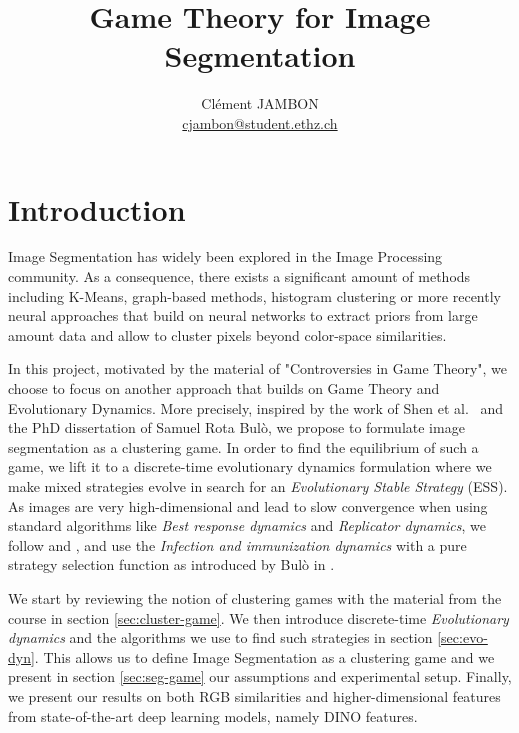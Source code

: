 \documentclass[11pt,a4paper]{article}
\begin{document}
\title{Game Theory for Image Segmentation}
\author{Clément JAMBON \\ \href{mailto:cjambon@student.ethz.ch}{cjambon@student.ethz.ch}}
\maketitle

    

\section{Introduction}

Image Segmentation has widely been explored in the Image Processing community. As a consequence, there exists a significant amount of methods including K-Means, graph-based methods\cite{graph-segmentation}, histogram clustering\cite{histogram-clustering} or more recently neural approaches that build on neural networks to extract priors from large amount data\cite{panoptic-segmentation} and allow to cluster pixels beyond color-space similarities.

In this project, motivated by the material of "Controversies in Game Theory"\cite{course-gt}, we choose to focus on another approach that builds on Game Theory and Evolutionary Dynamics. More precisely, inspired by the work of Shen et al.~\cite{game-clustering} and the PhD dissertation of Samuel Rota Bulò\cite{bulo-thesis}, we propose to formulate image segmentation as a clustering game. In order to find the equilibrium of such a game, we lift it to a discrete-time evolutionary dynamics formulation where we make mixed strategies evolve in search for an \textit{Evolutionary Stable Strategy} (ESS). As images are very high-dimensional and lead to slow convergence when using standard algorithms like \textit{Best response dynamics} and \textit{Replicator dynamics}, we follow \cite{game-clustering} and \cite{bulo-thesis}, and use the \textit{Infection and immunization dynamics} with a pure strategy selection function as introduced by Bulò in \cite{inimdyn}.

We start by reviewing the notion of clustering games with the material from the course\cite{course-gt} in section \ref{sec:cluster-game}. We then introduce discrete-time \textit{Evolutionary dynamics} and the algorithms we use to find such strategies in section \ref{sec:evo-dyn}. This allows us to define Image Segmentation as a clustering game and we present in section \ref{sec:seg-game} our assumptions and experimental setup. Finally, we present our results on both RGB similarities and higher-dimensional features from state-of-the-art deep learning models, namely DINO features\cite{dino}.
\end{document}
